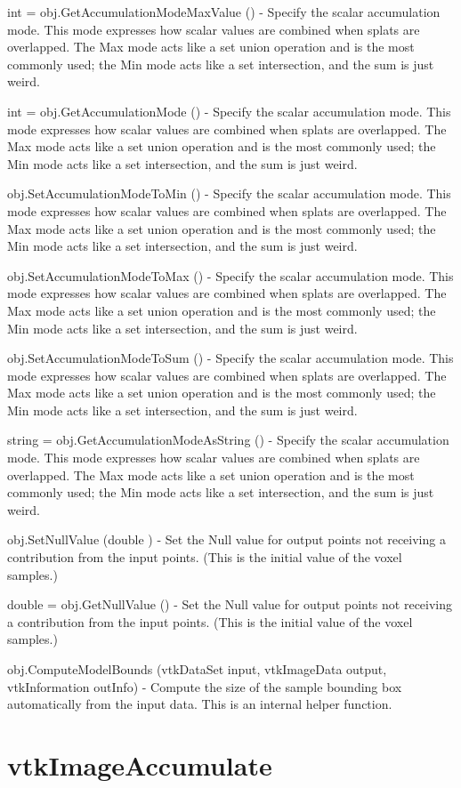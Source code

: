 \begin{DoxyItemize}
\item {\ttfamily int = obj.\-Get\-Accumulation\-Mode\-Max\-Value ()} -\/ Specify the scalar accumulation mode. This mode expresses how scalar values are combined when splats are overlapped. The Max mode acts like a set union operation and is the most commonly used; the Min mode acts like a set intersection, and the sum is just weird.  
\item {\ttfamily int = obj.\-Get\-Accumulation\-Mode ()} -\/ Specify the scalar accumulation mode. This mode expresses how scalar values are combined when splats are overlapped. The Max mode acts like a set union operation and is the most commonly used; the Min mode acts like a set intersection, and the sum is just weird.  
\item {\ttfamily obj.\-Set\-Accumulation\-Mode\-To\-Min ()} -\/ Specify the scalar accumulation mode. This mode expresses how scalar values are combined when splats are overlapped. The Max mode acts like a set union operation and is the most commonly used; the Min mode acts like a set intersection, and the sum is just weird.  
\item {\ttfamily obj.\-Set\-Accumulation\-Mode\-To\-Max ()} -\/ Specify the scalar accumulation mode. This mode expresses how scalar values are combined when splats are overlapped. The Max mode acts like a set union operation and is the most commonly used; the Min mode acts like a set intersection, and the sum is just weird.  
\item {\ttfamily obj.\-Set\-Accumulation\-Mode\-To\-Sum ()} -\/ Specify the scalar accumulation mode. This mode expresses how scalar values are combined when splats are overlapped. The Max mode acts like a set union operation and is the most commonly used; the Min mode acts like a set intersection, and the sum is just weird.  
\item {\ttfamily string = obj.\-Get\-Accumulation\-Mode\-As\-String ()} -\/ Specify the scalar accumulation mode. This mode expresses how scalar values are combined when splats are overlapped. The Max mode acts like a set union operation and is the most commonly used; the Min mode acts like a set intersection, and the sum is just weird.  
\item {\ttfamily obj.\-Set\-Null\-Value (double )} -\/ Set the Null value for output points not receiving a contribution from the input points. (This is the initial value of the voxel samples.)  
\item {\ttfamily double = obj.\-Get\-Null\-Value ()} -\/ Set the Null value for output points not receiving a contribution from the input points. (This is the initial value of the voxel samples.)  
\item {\ttfamily obj.\-Compute\-Model\-Bounds (vtk\-Data\-Set input, vtk\-Image\-Data output, vtk\-Information out\-Info)} -\/ Compute the size of the sample bounding box automatically from the input data. This is an internal helper function.  
\end{DoxyItemize}\hypertarget{vtkimaging_vtkimageaccumulate}{}\section{vtk\-Image\-Accumulate}\label{vtkimaging_vtkimageaccumulate}
